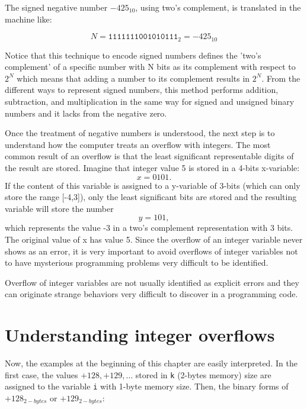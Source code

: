 The signed negative number $-425_{10}$, using two's complement, is translated in the machine like:

\begin{equation}
    N = \texttt{1111111001010111}_{2} = -425_{10}
\end{equation}

Notice that this technique to encode signed numbers defines the 'two's complement' of a specific number 
with N bits as its complement with respect to $2^N$ which means that adding a number to its complement 
results in $2^N$. From the different ways to represent signed numbers, this method performs addition, subtraction, and multiplication 
in the same way for signed and unsigned binary numbers and it lacks from the negative zero. 




Once the treatment of negative numbers is understood, the next step is to understand how the computer 
treats an overflow with integers.  
The most common result of an overflow is that the least significant representable digits 
of the result are stored. Imagine that integer value 5 is stored in a 4-bits x-variable:
$$
       x = 0101.
$$
If the content of this variable is assigned to a y-variable of 3-bits (which can only store the range [-4,3]),
only the least significant bits are stored and the 
resulting variable will store the number
$$
       y = 101,
$$
which represents the value -3 in a two's complement representation with 3 bits. The original value of x has value 5.  
Since the overflow of an integer variable never shows as an error, 
it is very important to avoid overflows of integer variables not to have mysterious 
programming problems very difficult to be identified. 


\begin{IN}
Overflow of integer variables are not usually identified as explicit errors and they 
can originate strange behaviors very difficult to discover in a programming code. 
\end{IN}




    \newpage 
    \section{Understanding integer overflows}  \label{sec:UndersIntOver}

Now, the examples at the beginning of this chapter are easily interpreted. In the first case, the 
values $+128, +129, \dots$ stored in \texttt{k} (2-bytes memory) size are assigned to the variable 
\texttt{i} with 1-byte memory size.
Then, the binary forms of $+128_{2-bytes}$ or $+129_{2-bytes}$:

